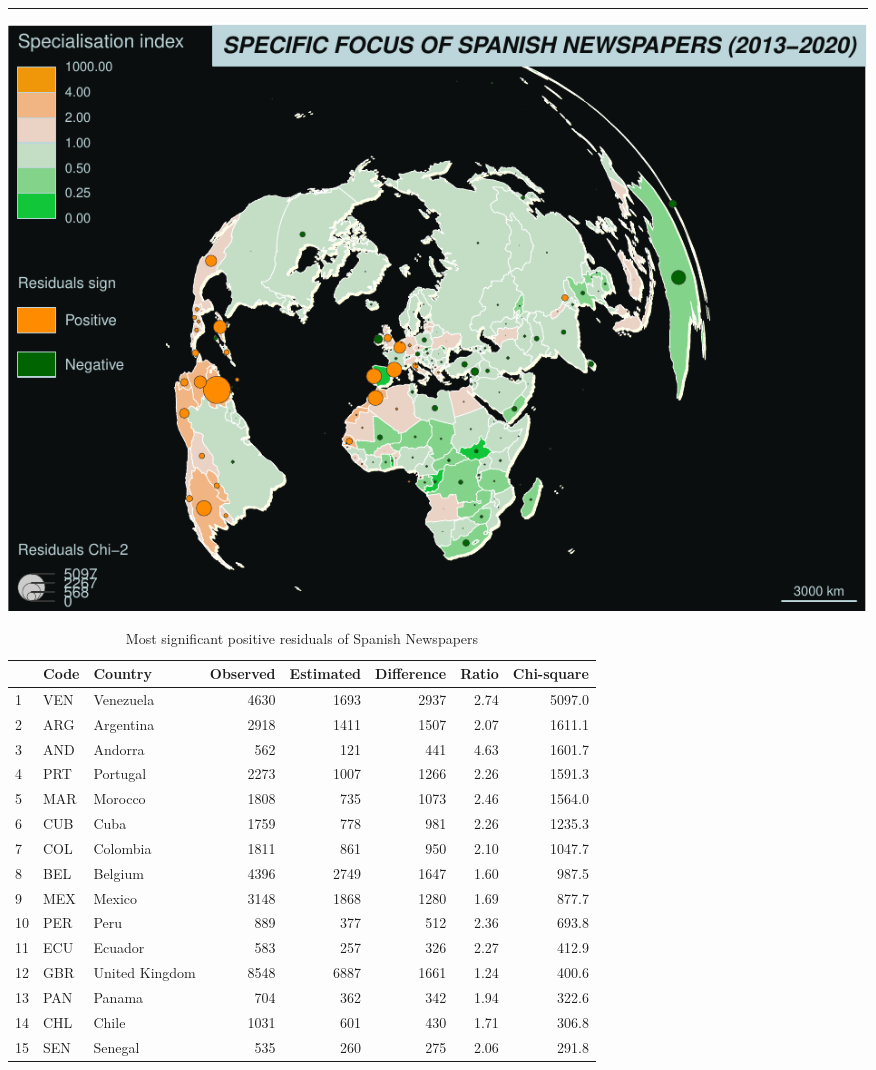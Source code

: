 \documentclass[
]{article}
\begin{document}
\begin{center}\rule{0.5\linewidth}{0.5pt}\end{center}

\includegraphics{Part2_maps_files/figure-latex/unnamed-chunk-21-1.pdf}

\begin{table}

\caption{\label{tab:unnamed-chunk-22}Most significant positive residuals of Spanish Newspapers}
\centering
\begin{tabular}[t]{l|l|l|r|r|r|r|r}
\hline
  & Code & Country & Observed & Estimated & Difference & Ratio & Chi-square\\
\hline
1 & VEN & Venezuela & 4630 & 1693 & 2937 & 2.74 & 5097.0\\
\hline
2 & ARG & Argentina & 2918 & 1411 & 1507 & 2.07 & 1611.1\\
\hline
3 & AND & Andorra & 562 & 121 & 441 & 4.63 & 1601.7\\
\hline
4 & PRT & Portugal & 2273 & 1007 & 1266 & 2.26 & 1591.3\\
\hline
5 & MAR & Morocco & 1808 & 735 & 1073 & 2.46 & 1564.0\\
\hline
6 & CUB & Cuba & 1759 & 778 & 981 & 2.26 & 1235.3\\
\hline
7 & COL & Colombia & 1811 & 861 & 950 & 2.10 & 1047.7\\
\hline
8 & BEL & Belgium & 4396 & 2749 & 1647 & 1.60 & 987.5\\
\hline
9 & MEX & Mexico & 3148 & 1868 & 1280 & 1.69 & 877.7\\
\hline
10 & PER & Peru & 889 & 377 & 512 & 2.36 & 693.8\\
\hline
11 & ECU & Ecuador & 583 & 257 & 326 & 2.27 & 412.9\\
\hline
12 & GBR & United Kingdom & 8548 & 6887 & 1661 & 1.24 & 400.6\\
\hline
13 & PAN & Panama & 704 & 362 & 342 & 1.94 & 322.6\\
\hline
14 & CHL & Chile & 1031 & 601 & 430 & 1.71 & 306.8\\
\hline
15 & SEN & Senegal & 535 & 260 & 275 & 2.06 & 291.8\\
\hline
\end{tabular}
\end{table}
\end{document}
